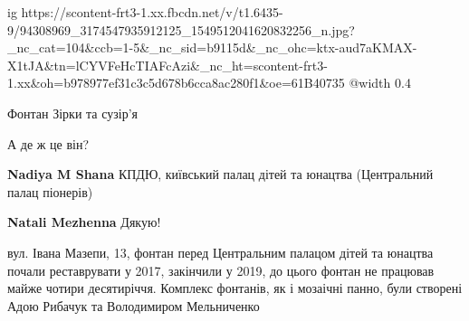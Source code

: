  
 
 
 
 

\ifcmt
  ig https://scontent-frt3-1.xx.fbcdn.net/v/t1.6435-9/94308969_3174547935912125_1549512041620832256_n.jpg?_nc_cat=104&ccb=1-5&_nc_sid=b9115d&_nc_ohc=ktx-aud7aKMAX-X1tJA&tn=lCYVFeHcTIAFcAzi&_nc_ht=scontent-frt3-1.xx&oh=b978977ef31c3c5d678b6cca8ac280f1&oe=61B40735
  @width 0.4
\fi

Фонтан Зірки та сузір'я

А де ж це він?

\textbf{Nadiya M Shana} КПДЮ, київський палац дітей та юнацтва (Центральний палац піонерів)

\textbf{Natali Mezhenna} Дякую!


вул. Івана Мазепи, 13, фонтан перед Центральним палацом дітей та юнацтва почали
реставрувати у 2017, закінчили у 2019, до цього фонтан не працював майже чотири
десятиріччя. Комплекс фонтанів, як і мозаічні панно, були створені Адою Рибачук
та Володимиром Мельниченко
